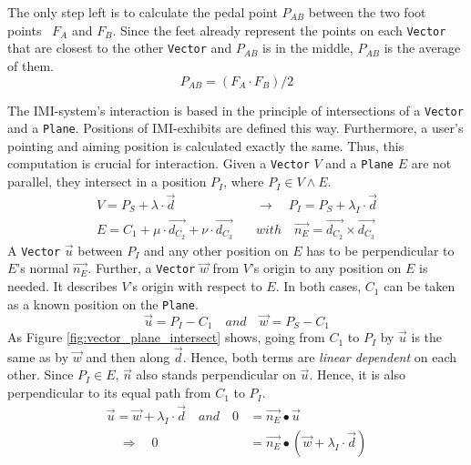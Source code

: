 The only step left is to calculate the pedal point $P_{AB}$ between the two foot points~\cite{PedalPoint} $F_{A}$ and $F_{B}$. Since the feet already represent the points on each \texttt{Vector} that are closest to the other \texttt{Vector} and $P_{AB}$ is in the middle, $P_{AB}$ is the average of them.
$$P_{AB} = (F_{A} \cdot F_{B}) / 2$$

The \ac{IMI}-system's interaction is based in the principle of intersections of a \texttt{Vector} and a \texttt{Plane}. Positions of \ac{IMI}-exhibits are defined this way. Furthermore, a user's pointing and aiming position is calculated exactly the same. Thus, this computation is crucial for interaction. Given a \texttt{Vector} $V$ and a \texttt{Plane} $E$ are not parallel, they intersect in a position $P_{I}$, where $P_{I} \in V \wedge E$.   
\begin{align*}
	V = P_{S} + \lambda \cdot \overrightarrow{d} \quad &\to \quad P_{I} = P_{S} + \lambda_{I} \cdot \overrightarrow{d} \\
	E = C_{1} + \mu \cdot \overrightarrow{d_{C_{2}}} + \nu \cdot \overrightarrow{d_{C_{3}}} \quad &with \quad \overrightarrow{n_{E}} = \overrightarrow{d_{C_{2}}} \times \overrightarrow{d_{C_{3}}}
\end{align*}
A \texttt{Vector} $\overrightarrow{u}$ between $P_{I}$ and any other position on $E$ has to be perpendicular to $E$'s normal $\overrightarrow{n_{E}}$. Further, a \texttt{Vector} $\overrightarrow{w}$ from $V$'s origin to any position on $E$ is needed. It describes $V$'s origin with respect to $E$. In both cases, $C_{1}$ can be taken as a known position on the \texttt{Plane}.
$$\overrightarrow{u} = P_{I} - C_{1} \quad and \quad \overrightarrow{w} = P_{S} - C_{1}$$
As Figure \ref{fig:vector_plane_intersect} shows, going from $C_{1}$ to $P_{I}$ by $\overrightarrow{u}$ is the same as by $\overrightarrow{w}$ and then along $\overrightarrow{d}$. Hence, both terms are \textit{linear dependent} on each other. Since $P_{I} \in E$, $\overrightarrow{n}$ also stands perpendicular on $\overrightarrow{u}$. Hence, it is also perpendicular to its equal path from $C_{1}$ to $P_{I}$.
\begin{align*}
	\overrightarrow{u} = \overrightarrow{w} + \lambda_{I} \cdot \overrightarrow{d} \quad and \quad 0 &= \overrightarrow{n_{E}} \bullet \overrightarrow{u} \\
	\quad \Rightarrow \quad 0 &= \overrightarrow{n_{E}} \bullet (\overrightarrow{w} + \lambda_{I} \cdot \overrightarrow{d})
\end{align*}

